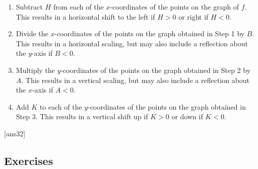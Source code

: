 \documentclass{amsbook}
\numberwithin{section}{chapter}
\numberwithin{equation}{chapter}
\begin{document}
	\begin{enumerate}
		
		\item  Subtract $H$ from each of the $x$-coordinates of the points on the graph of $f$.  This results in a horizontal shift to the left if $H > 0$ or right if $H< 0$.
		
		\item  Divide the $x$-coordinates of the points on the graph obtained in Step 1 by $B$.  This results in a horizontal scaling, but may also include a reflection about the $y$-axis if $B < 0$.
		
		\item  Multiply the $y$-coordinates of the points on the graph obtained in Step 2 by $A$.   This results in a vertical scaling, but may also include a reflection about the $x$-axis if $A < 0$.
		
		\item  Add $K$ to each of the $y$-coordinates of the points on the graph obtained in Step 3.  This results in a vertical shift up if $K > 0$ or down if $K< 0$.
		
	\end{enumerate}


\bigskip


[ans32]
\subsection*{Exercises \nopunct} \hfill
\end{document}
